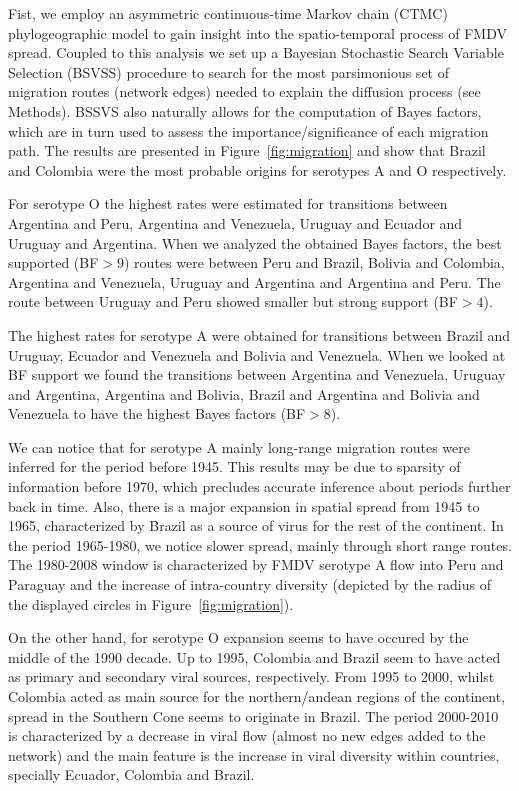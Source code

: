 \documentclass[10pt]{article}
\begin{document}
Fist, we employ an asymmetric continuous-time Markov chain (CTMC) phylogeographic model \cite{roots} to gain insight into the spatio-temporal process of FMDV spread. Coupled to this analysis we set up a Bayesian Stochastic Search Variable Selection (BSVSS) procedure to search for the most parsimonious set of migration routes (network edges) needed to explain the diffusion process (see Methods).
BSSVS also naturally allows for the computation of Bayes factors, which are in turn used to assess the importance/significance of each migration path.
The results are presented in Figure~\ref{fig:migration} and show that Brazil and Colombia were the most probable origins for serotypes A and O respectively.

For serotype O the highest rates were estimated for transitions between Argentina and Peru, Argentina and Venezuela, Uruguay and Ecuador and Uruguay and Argentina. When we analyzed the obtained Bayes factors, the best supported (BF$>9$) routes were between Peru and Brazil, Bolivia and Colombia, Argentina and Venezuela, Uruguay and Argentina and Argentina and Peru. The route between Uruguay and Peru showed smaller but strong support (BF$>4$).

The highest rates for serotype A were obtained for transitions between Brazil and Uruguay, Ecuador and Venezuela and Bolivia and Venezuela. When we looked at BF support we found the transitions between Argentina and Venezuela, Uruguay and Argentina, Argentina and Bolivia, Brazil and Argentina and Bolivia and Venezuela to have the highest Bayes factors (BF$>8$).

We can notice that for serotype A mainly long-range migration routes were inferred for the period before 1945.
This results may be due to sparsity of information before 1970, which precludes accurate inference about periods further back in time. 
Also, there is a major expansion in spatial spread from 1945 to 1965, characterized by Brazil as a source of virus for the rest of the continent.
In the period 1965-1980, we notice slower spread, mainly through short range routes.
The 1980-2008 window is characterized by FMDV serotype A flow into Peru and Paraguay and the increase of intra-country diversity (depicted by the radius of the displayed circles in Figure~\ref{fig:migration}).   

On the other hand, for serotype O expansion seems to have occured by the middle of the 1990 decade.
Up to 1995, Colombia and Brazil seem to have acted as primary and secondary viral sources, respectively.
From 1995 to 2000, whilst Colombia acted as main source for the northern/andean regions of the continent, spread in the Southern Cone seems to originate in Brazil.
The period 2000-2010 is characterized by a decrease in viral flow (almost no new edges added to the network) and the main feature is the increase in viral diversity within countries, specially Ecuador, Colombia and Brazil.
\end{document}
